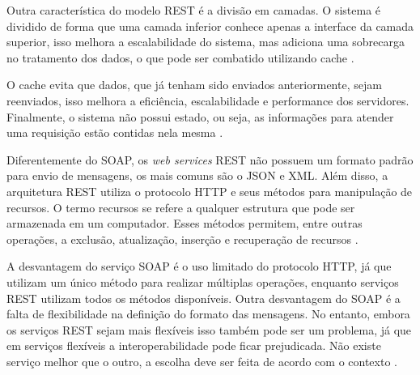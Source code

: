 Outra característica do modelo REST é a divisão em camadas. O sistema é dividido de forma que 
uma camada inferior conhece apenas a interface da camada superior, isso melhora a 
escalabilidade do sistema, mas adiciona uma sobrecarga no tratamento dos dados, o que pode 
ser combatido utilizando cache \cite{fielding2000architectural}. 

O cache evita que dados, que já tenham sido enviados anteriormente, sejam reenviados, isso 
melhora a eficiência, escalabilidade e performance dos servidores. Finalmente, o sistema 
não possui estado, ou seja, as informações para atender uma requisição estão contidas nela 
mesma \cite{fielding2000architectural}.

Diferentemente do SOAP, os \textit{web services} REST não possuem um formato padrão para envio 
de mensagens, os mais comuns são o JSON e XML. Além disso, a arquitetura REST utiliza o 
protocolo HTTP e seus métodos para manipulação de recursos. O termo recursos se refere a 
qualquer estrutura que pode ser armazenada em um computador. Esses métodos permitem, entre 
outras operações, a exclusão, atualização, inserção e recuperação de recursos \cite{lima2012}.

A desvantagem do serviço SOAP é o uso limitado do protocolo HTTP, já que utilizam um único 
método para realizar múltiplas operações, enquanto serviços REST utilizam todos os métodos 
disponíveis. Outra desvantagem do SOAP é a falta de flexibilidade na definição do formato 
das mensagens. No entanto, embora os serviços REST sejam mais flexíveis isso também pode ser 
um problema, já que em serviços flexíveis a interoperabilidade pode ficar prejudicada. Não 
existe serviço melhor que o outro, a escolha deve ser feita de acordo com o contexto 
\cite{lima2012}.